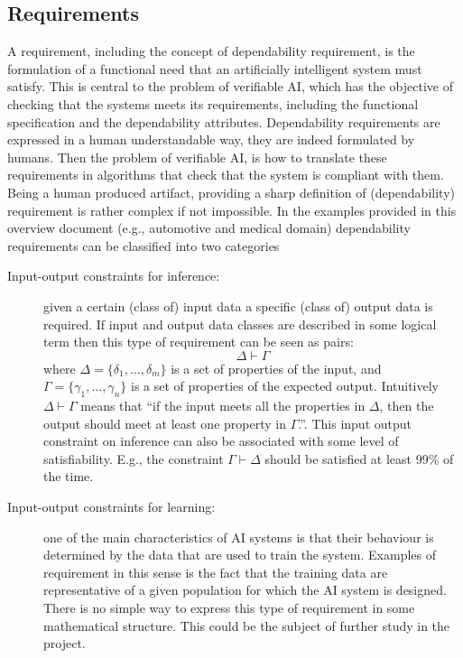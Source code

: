 \subsection{Requirements}
A requirement, including the concept of dependability requirement, is the formulation of a functional need that an  artificially intelligent
system must satisfy. This is central to the problem of verifiable AI, which has the
objective of checking that the systems meets its
requirements, including the functional specification and the dependability attributes. 
Dependability requirements are expressed in a human understandable
way, they are indeed formulated by humans. Then the problem of
verifiable AI, is how to translate these requirements in algorithms
that check that the system is compliant with them. 
Being a human produced artifact, providing a sharp definition of
(dependability) requirement is rather complex if not impossible. In
the examples provided in this overview document (e.g., automotive and
medical domain) dependability requirements can be classified into two
categories 
\begin{description}
\item[Input-output constraints for inference:] given a certain (class of) input data
  a specific (class of) output data is required. If input and output
  data classes are described in some logical term then this type of
  requirement can be seen as pairs: 
$$
\Delta\vdash\Gamma 
$$
where $\Delta=\{\delta_1,\dots,\delta_m\}$ is a set of properties of
the input, and $\Gamma=\{\gamma_1,\dots,\gamma_n\}$ is a set of
properties of the expected output. Intuitively $ \Delta\vdash\Gamma $
means that ``if the input meets all the properties in $\Delta$, then
the output should meet at least one property in $\Gamma$.''.  This
input output constraint on inference can also be associated with some
level of satisfiability. E.g., the constraint $\Gamma\vdash\Delta$
should be satisfied at least 99\% of the time.

\item[Input-output constraints for learning:] one of the main
  characteristics of AI systems is that their behaviour is determined
  by the data that are used to train the system. Examples of
  requirement in this sense is the fact that the training data are
  representative of a given population for which the AI system is
  designed. There is no simple way to express this type of requirement
  in some mathematical structure. This could be the subject of further
  study in the project. 
\end{description}

